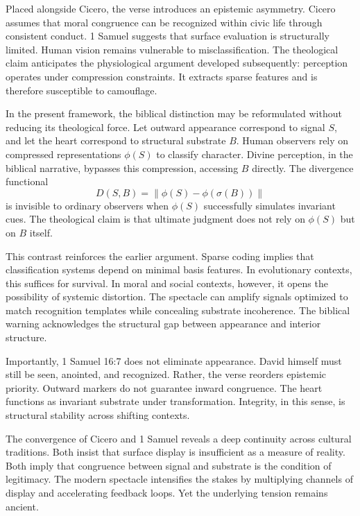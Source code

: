 \documentclass[11pt]{article}
\begin{document}
Placed alongside Cicero, the verse introduces an epistemic asymmetry. Cicero assumes that moral congruence can be recognized within civic life through consistent conduct. 1 Samuel suggests that surface evaluation is structurally limited. Human vision remains vulnerable to misclassification. The theological claim anticipates the physiological argument developed subsequently: perception operates under compression constraints. It extracts sparse features and is therefore susceptible to camouflage.

In the present framework, the biblical distinction may be reformulated without reducing its theological force. Let outward appearance correspond to signal $S$, and let the heart correspond to structural substrate $B$. Human observers rely on compressed representations $\phi(S)$ to classify character. Divine perception, in the biblical narrative, bypasses this compression, accessing $B$ directly. The divergence functional
\[
D(S,B) = \|\phi(S) - \phi(\sigma(B))\|
\]
is invisible to ordinary observers when $\phi(S)$ successfully simulates invariant cues. The theological claim is that ultimate judgment does not rely on $\phi(S)$ but on $B$ itself.

This contrast reinforces the earlier argument. Sparse coding implies that classification systems depend on minimal basis features. In evolutionary contexts, this suffices for survival. In moral and social contexts, however, it opens the possibility of systemic distortion. The spectacle can amplify signals optimized to match recognition templates while concealing substrate incoherence. The biblical warning acknowledges the structural gap between appearance and interior structure.

Importantly, 1 Samuel 16:7 does not eliminate appearance. David himself must still be seen, anointed, and recognized. Rather, the verse reorders epistemic priority. Outward markers do not guarantee inward congruence. The heart functions as invariant substrate under transformation. Integrity, in this sense, is structural stability across shifting contexts.

The convergence of Cicero and 1 Samuel reveals a deep continuity across cultural traditions. Both insist that surface display is insufficient as a measure of reality. Both imply that congruence between signal and substrate is the condition of legitimacy. The modern spectacle intensifies the stakes by multiplying channels of display and accelerating feedback loops. Yet the underlying tension remains ancient.
\end{document}
